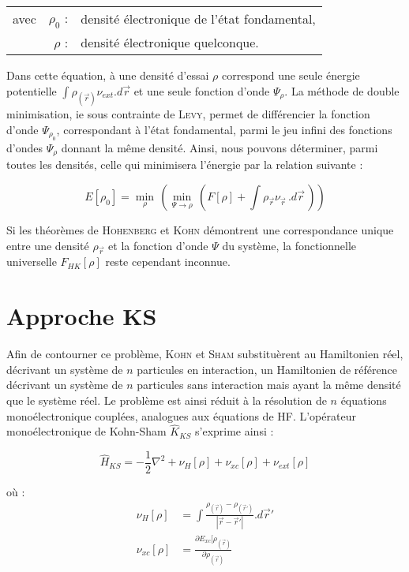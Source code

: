 \begin{flushleft}
\begin{tabular}{@{}lrp{10cm}}
avec & $\rho_{0}$ : & densité électronique de l'état fondamental, \\
& $\rho$ : & densité électronique quelconque.
\end{tabular}
\end{flushleft}

Dans cette équation, à une densité d'essai $\rho$ correspond une seule énergie potentielle $\int \rho_{(\vec{r})} \nu_{ext} .d\vec{r}$ et une seule fonction d'onde $\Psi_{\rho}$. La méthode de double minimisation, ie sous contrainte de \textsc{Levy}, permet de différencier la fonction d'onde $\Psi_{\rho_{0}}$, correspondant à l'état fondamental, parmi le jeu infini des fonctions d'ondes $\Psi_{\rho}$ donnant la même densité. Ainsi, nous pouvons déterminer, parmi toutes les densités, celle qui minimisera l'énergie par la relation suivante :

\begin{equation}
E[\rho_{0}] = \min\limits_{\rho}\, (\min\limits_{\Psi\rightarrow\rho}\, (F[\rho] + \int \rho_{\vec{r}} \nu_{\vec{r}}\, .d\vec{r}\, ))
\end{equation}

Si les théorèmes de \textsc{Hohenberg} et \textsc{Kohn} démontrent une correspondance unique entre une densité $\rho_{\vec{r}}$ et la fonction d'onde $\Psi$ du système, la fonctionnelle universelle $F_{HK}[\rho]$ reste cependant inconnue.

\section{Approche KS}\label{Kohn-Sham}

Afin de contourner ce problème, \textsc{Kohn} et \textsc{Sham} substituèrent au Hamiltonien réel, décrivant un système de $n$ particules en interaction, un Hamiltonien de référence décrivant un système de $n$ particules sans interaction mais ayant la même densité que le système réel. Le problème est ainsi réduit à la résolution de $n$ équations monoélectronique couplées, analogues aux équations de HF. L'opérateur monoélectronique de Kohn-Sham $\hat{K}_{KS}$ s'exprime ainsi :

\begin{equation}
\hat{H}_{KS} = -\frac{1}{2} \nabla^{2} + \nu_{H}[\rho] + \nu_{xc}[\rho] + \nu_{ext}[\rho]
\end{equation}

\noindent où :
\begin{align}
\nu_{H}[\rho] &= \int \frac{\rho_{(\vec{r})} - \rho_{(\vec{r}')}}{|\vec{r} - \vec{r}'|} .d\vec{r}' \\
\nu_{xc}[\rho] &= \frac{\partial E_{xc}[\rho_{(\vec{r})}}{\partial\rho_{(\vec{r})}}
\end{align}

